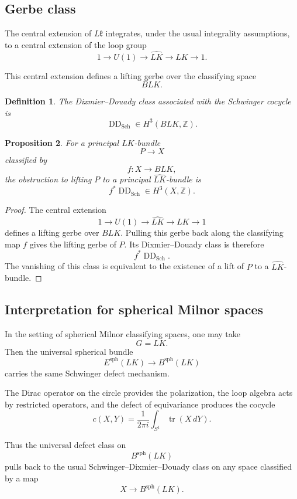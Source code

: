 \documentclass[11pt]{amsart}
\newtheorem{definition}{Definition}[section]
\newtheorem{proposition}[definition]{Proposition}
\begin{document}
\subsection{Gerbe class}

The central extension of \(L\mathfrak k\) integrates, under the usual integrality assumptions, to a central extension of the loop group
\[
1\longrightarrow U(1)
\longrightarrow
\widehat{LK}
\longrightarrow
LK
\longrightarrow
1.
\]

This central extension defines a lifting gerbe over the classifying space
\[
B LK.
\]

\begin{definition}
The Dixmier--Douady class associated with the Schwinger cocycle is
\[
\operatorname{DD}_{\mathrm{Sch}}
\in
H^3(BLK,\mathbb Z).
\]
\end{definition}

\begin{proposition}
For a principal \(LK\)-bundle
\[
P\to X
\]
classified by
\[
f:X\to BLK,
\]
the obstruction to lifting \(P\) to a principal \(\widehat{LK}\)-bundle is
\[
f^*\operatorname{DD}_{\mathrm{Sch}}
\in
H^3(X,\mathbb Z).
\]
\end{proposition}

\begin{proof}
The central extension
\[
1\to U(1)\to \widehat{LK}\to LK\to1
\]
defines a lifting gerbe over \(BLK\). Pulling this gerbe back along the classifying map \(f\) gives the lifting gerbe of \(P\). Its Dixmier--Douady class is therefore
\[
f^*\operatorname{DD}_{\mathrm{Sch}}.
\]
The vanishing of this class is equivalent to the existence of a lift of \(P\) to a \(\widehat{LK}\)-bundle.
\end{proof}

\subsection{Interpretation for spherical Milnor spaces}

In the setting of spherical Milnor classifying spaces, one may take
\[
G=LK.
\]
Then the universal spherical bundle
\[
E^{\mathrm{sph}}(LK)\to B^{\mathrm{sph}}(LK)
\]
carries the same Schwinger defect mechanism.

The Dirac operator on the circle provides the polarization, the loop algebra acts by restricted operators, and the defect of equivariance produces the cocycle
\[
c(X,Y)
=
\frac{1}{2\pi i}
\int_{S^1}
\operatorname{tr}(X\,dY).
\]

Thus the universal defect class on
\[
B^{\mathrm{sph}}(LK)
\]
pulls back to the usual Schwinger--Dixmier--Douady class on any space classified by a map
\[
X\to B^{\mathrm{sph}}(LK).
\]
\end{document}
